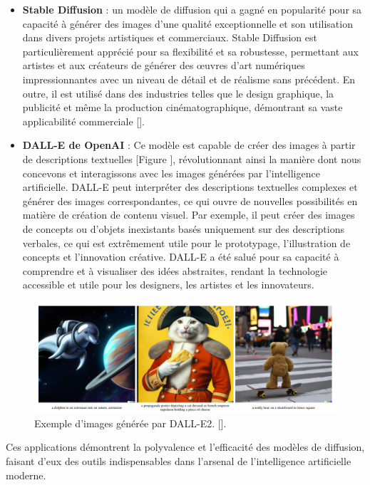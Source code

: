 \begin{itemize}
	\item \textbf{Stable Diffusion} : un modèle de diffusion qui a gagné en popularité pour sa capacité à générer des images d’une qualité exceptionnelle et son utilisation dans divers projets artistiques et commerciaux. Stable Diffusion est particulièrement apprécié pour sa flexibilité et sa robustesse, permettant aux artistes et aux créateurs de générer des œuvres d'art numériques impressionnantes avec un niveau de détail et de réalisme sans précédent. En outre, il est utilisé dans des industries telles que le design graphique, la publicité et même la production cinématographique, démontrant sa vaste applicabilité commerciale [\cite{rombach2022high}].

	\item \textbf{DALL-E de OpenAI} : Ce modèle est capable de créer des images à partir de descriptions textuelles [Figure \cite{fig:Dalle}], révolutionnant ainsi la manière dont nous concevons et interagissons avec les images générées par l’intelligence artificielle. DALL-E peut interpréter des descriptions textuelles complexes et générer des images correspondantes, ce qui ouvre de nouvelles possibilités en matière de création de contenu visuel. Par exemple, il peut créer des images de concepts ou d'objets inexistants basés uniquement sur des descriptions verbales, ce qui est extrêmement utile pour le prototypage, l'illustration de concepts et l'innovation créative. DALL-E a été salué pour sa capacité à comprendre et à visualiser des idées abstraites, rendant la technologie accessible et utile pour les designers, les artistes et les innovateurs.
\end{itemize}

\begin{figure}[hbt!]
	\centering
	\includegraphics[width=12cm]{images_pfe/dalle.png}
	\caption{Exemple d’images générée par DALL-E2. [\cite{ramesh2022hierarchical}].}
	\label{fig:Dalle}
\end{figure}
\FloatBarrier

Ces applications démontrent la polyvalence et l'efficacité des modèles de
diffusion, faisant d'eux des outils indispensables dans l'arsenal de
l'intelligence artificielle moderne.

